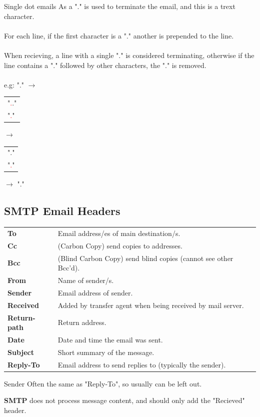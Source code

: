 \begin{sidenotebox}{Single dot emails}
    As a "." is used to terminate the email, and this is a trext character.
    \\
    \\ For each line, if the first character is a "." another is prepended to the line.
    \\
    \\ When recieving, a line with a single "." is considered terminating, otherwise if the line contains a "." followed by other characters, the "." is removed.
    \\
    \\ e.g:
    "." $\to$ \begin{tabular}{l}
        "\textcolor{red}{.}." \\
        "\textcolor{red}{.}"  \\
    \end{tabular} $\to$ \begin{tabular}{l}
        "."                  \\
        "\textcolor{red}{.}" \\
    \end{tabular} $\to$ "."
\end{sidenotebox}
\subsection{SMTP Email Headers}
\begin{center}
    \begin{tabular}{l p{}}
        \textbf{To}          & Email address/es of main destination/s.                         \\
        \textbf{Cc}          & (Carbon Copy) send copies to addresses.                         \\
        \textbf{Bcc}         & (Blind Carbon Copy) send blind copies (cannot see other Bcc'd). \\
        \textbf{From}        & Name of sender/s.                                               \\
        \textbf{Sender}      & Email address of sender.                                        \\
        \textbf{Received}    & Added by transfer agent when being received by mail server.     \\
        \textbf{Return-path} & Return address.                                                 \\
        \textbf{Date}        & Date and time the email was sent.                               \\
        \textbf{Subject}     & Short summary of the message.                                   \\
        \textbf{Reply-To}    & Email address to send replies to (typically the sender).        \\
    \end{tabular}
\end{center}
\begin{sidenotebox}{Sender}
    Often the same as "Reply-To", so usually can be left out.
\end{sidenotebox}
\textbf{SMTP} does not process message content, and should only add the "Recieved" header.
